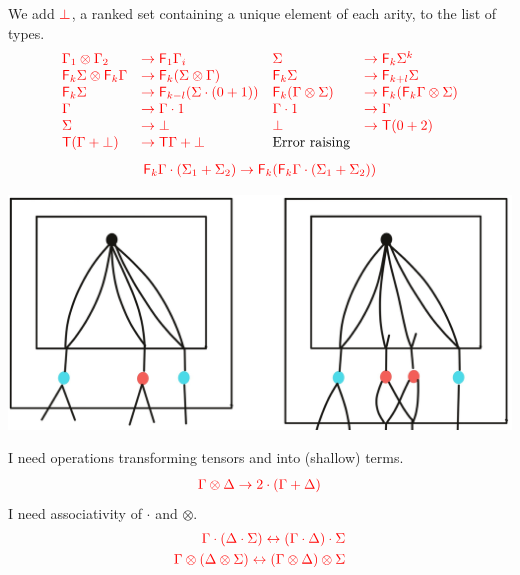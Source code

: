 We add ${\color{red}{\bot}}$, a ranked set containing a unique element of each arity, to the list of types. 
$$
\begin{array}{llll}
{\color{red}{\Gamma_1\otimes\Gamma_2}} &{\color{red}{\to {\color{red}{\mathsf F_{1}}}\Gamma_i}}&
{\color{red}{\Sigma}}&{\color{red}{\to {\color{red}{\mathsf F_{k}}}\Sigma^k}}\\
{\color{red}{{\color{red}{\mathsf F_{k}}}\Sigma \otimes {\color{red}{\mathsf F_{k}}}\Gamma }}&{\color{red}{\to {\color{red}{\mathsf F_{k}}}(\Sigma\otimes \Gamma)}}&
{\color{red}{{\color{red}{\mathsf F_{k}}}\Sigma }}&{\color{red}{\to {\color{red}{\mathsf F_{k+l}}}\Sigma }}\\
{\color{red}{{\color{red}{\mathsf F_{k}}}\Sigma }}&{\color{red}{\to {\color{red}{\mathsf F_{k-l}}}(\Sigma\cdot(0+1))}}&
{\color{red}{{\color{red}{\mathsf F_{k}}}(\Gamma\otimes \Sigma) }}&{\color{red}{\to {\color{red}{\mathsf F_{k}}}({\color{red}{\mathsf F_{k}}}\Gamma \otimes \Sigma)}}\\
{\color{red}{\Gamma }}&{\color{red}{\to \Gamma\cdot 1}}& {\color{red}{\Gamma\cdot 1 }}&{\color{red}{\to \Gamma}}\\
{\color{red}{\Sigma}}&{\color{red}{\to\bot}}&
{\color{red}{\bot }}&{\color{red}{\to {\color{red}{\mathsf T}}(0+2)}}\\
{\color{red}{{\color{red}{\mathsf T}}(\Gamma+\bot)}}&{\color{red}{\to {\color{red}{\mathsf T}}\Gamma+\bot}} & \text{Error raising}
\end{array}$$
\begin{align*}
{\color{red}{{\color{red}{\mathsf F_{k}}}\Gamma\cdot(\Sigma_1+\Sigma_2)\to {\color{red}{\mathsf F_{k}}}({\color{red}{\mathsf F_{k}}}\Gamma\cdot(\Sigma_1+\Sigma_2))}}
\end{align*}
\begin{center}
\includegraphics[scale=.05]{MyPicBasicFun1.jpg}
\end{center}
I need operations transforming tensors and into (shallow) terms.
\begin{align*}
{\color{red}{\Gamma\otimes \Delta \to 2\cdot(\Gamma+\Delta)}}
\end{align*}
I need associativity of $\cdot$ and $\otimes$.
\begin{align*}
{\color{red}{\Gamma\cdot(\Delta\cdot\Sigma) \leftrightarrow (\Gamma\cdot\Delta)\cdot\Sigma}}\\
{\color{red}{\Gamma\otimes(\Delta\otimes\Sigma) \leftrightarrow (\Gamma\otimes\Delta)\otimes\Sigma}}
\end{align*}

